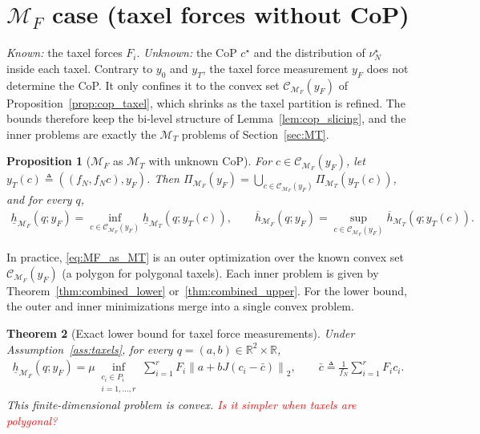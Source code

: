 \documentclass[11pt,a4paper]{article}
\theoremstyle{plain}
\newtheorem{theorem}{Theorem}[section]
\newtheorem{proposition}[theorem]{Proposition}
\begin{document}
\section{$\mathcal{M}_F$ case (taxel forces without CoP)}
\label{sec:MF}

\textit{Known:} the taxel forces $F_i$. \textit{Unknown:} the CoP $c^\star$ and the distribution of $\nu_N^\star$ inside each taxel.
Contrary to $y_0$ and $y_T$, the taxel force measurement $y_F$ does not determine the CoP. It only confines it to the convex set
$\mathcal C_{\mathcal M_F}(y_F)$ of Proposition~\ref{prop:cop_taxel}, which shrinks as the taxel partition is refined. The bounds therefore keep the
bi-level structure of Lemma~\ref{lem:cop_slicing}, and the inner problems are exactly the $\mathcal M_T$ problems of Section~\ref{sec:MT}.

\begin{proposition}[$\mathcal M_F$ as $\mathcal M_T$ with unknown CoP]
\label{prop:MF_as_MT}
    For $c\in\mathcal C_{\mathcal M_F}(y_F)$, let $y_T(c)\triangleq((f_N,f_Nc),y_F)$. Then
    $\Pi_{\mathcal M_F}(y_F)=\bigcup_{c\in\mathcal C_{\mathcal M_F}(y_F)}\Pi_{\mathcal M_T}(y_T(c))$, and for every $q$,
    \begin{align}
        \label{eq:MF_as_MT}
        \boxed{
        \underline h_{\mathcal M_F}(q;y_F)=\inf_{c\in\mathcal C_{\mathcal M_F}(y_F)}\underline h_{\mathcal M_T}(q;y_T(c)),
        \qquad
        \overline h_{\mathcal M_F}(q;y_F)=\sup_{c\in\mathcal C_{\mathcal M_F}(y_F)}\overline h_{\mathcal M_T}(q;y_T(c)).}
    \end{align}
\end{proposition}

In practice, \eqref{eq:MF_as_MT} is an outer optimization over the known convex set $\mathcal C_{\mathcal M_F}(y_F)$ (a polygon for polygonal taxels).
Each inner problem is given by Theorem~\ref{thm:combined_lower} or~\ref{thm:combined_upper}. For the lower bound, the outer and inner minimizations merge into a single convex problem.

\begin{theorem}[Exact lower bound for taxel force measurements]
\label{thm:taxel_lower}
    Under Assumption~\ref{ass:taxels}, for every $q=(a,b)\in\mathbb R^2\times\mathbb R$,
    \begin{align}
        \label{eq:taxel_lower_reduction}
        \boxed{\underline h_{\mathcal M_F}(q;y_F)
        =
        \mu
        \inf_{\substack{c_i\in P_i\\i=1,\ldots,r}}
        \sum_{i=1}^r
        F_i\left\|a+bJ(c_i-\bar c)\right\|_2,
        \qquad
        \bar c
        \triangleq
        \frac{1}{f_N}\sum_{i=1}^r F_i c_i.}
    \end{align}
    This finite-dimensional problem is convex. \textcolor{red}{Is it simpler when taxels are polygonal?}
\end{theorem}
\end{document}
